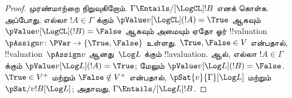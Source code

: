 \documentclass[../../../include/open-logic-section]{subfiles}
\begin{document}
\begin{proof}
  முரண்மாற்றை நிறுவுகிறோம். $\Gamma \Entails/[\LogCL] !B$ எனக் கொள்க.
  அப்போது, எல்லா $!A \in \Gamma$ க்கும்
  $\pValue v[\LogCL](!A) = \True$ ஆகவும்
  $\pValue v[\LogCL](!B) = \False$ ஆகவும் அமையும் ஏதோ ஓர்
  !!{valuation}~$\pAssign v\colon \PVar \to
  \{\True, \False\}$ உள்ளது. $\True,
  \False \in V$ என்பதால், !!{valuation}~$\pAssign v$ ஆனது~$\Log L$
  க்கும் !!a{valuation}.  ஆல், எல்லா
  $!A \in \Gamma$ க்கும் $\pValue v[\Log L](!A) =
  \True$; மேலும் $\pValue v[\Log L](!B) = \False$.
  $\True \in V^+$ மற்றும் $\False \notin V^+$ என்பதால்,
  $\pSat{v}{\Gamma}[\Log L]$ மற்றும் $\pSat/{v}{!B}[\Log L]$; அதாவது,
  $\Gamma \Entails/[\Log L] !B$.
\end{proof}
\end{document}
